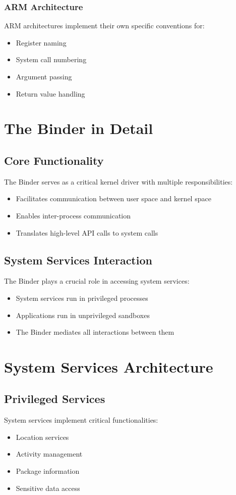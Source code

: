 \documentclass{article}
\begin{document}
\subsubsection{ARM Architecture}
ARM architectures implement their own specific conventions for:
\begin{itemize}
    \item Register naming
    \item System call numbering
    \item Argument passing
    \item Return value handling
\end{itemize}

\section{The Binder in Detail}
\subsection{Core Functionality}
The Binder serves as a critical kernel driver with multiple responsibilities:
\begin{itemize}
    \item Facilitates communication between user space and kernel space
    \item Enables inter-process communication
    \item Translates high-level API calls to system calls
\end{itemize}

\subsection{System Services Interaction}
The Binder plays a crucial role in accessing system services:
\begin{itemize}
    \item System services run in privileged processes
    \item Applications run in unprivileged sandboxes
    \item The Binder mediates all interactions between them
\end{itemize}

\section{System Services Architecture}
\subsection{Privileged Services}
System services implement critical functionalities:
\begin{itemize}
    \item Location services
    \item Activity management
    \item Package information
    \item Sensitive data access
\end{itemize}
\end{document}
